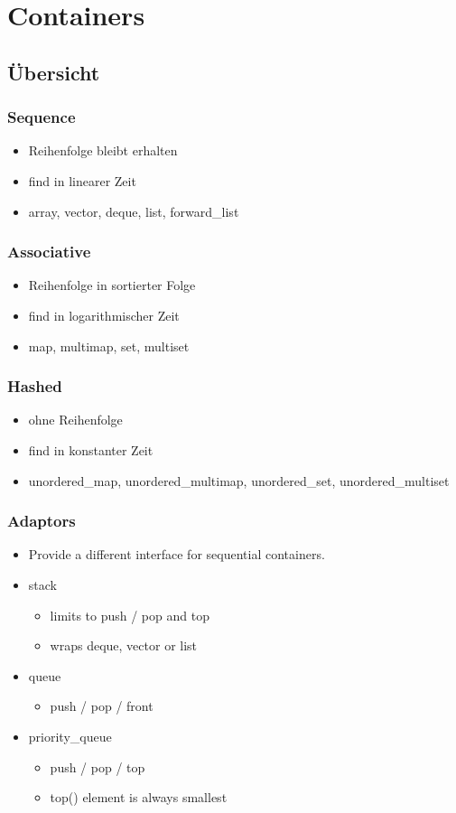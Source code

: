 \section{Containers}
\subsection{Übersicht}
\subsubsection{Sequence}
\begin{itemize}
	\item Reihenfolge bleibt erhalten
	\item find  in linearer Zeit
	\item array, vector, deque, list, forward\_list
\end{itemize}
\subsubsection{Associative}
\begin{itemize}
	\item Reihenfolge in sortierter Folge
	\item find  in logarithmischer Zeit
	\item map, multimap, set, multiset
\end{itemize}
\subsubsection{Hashed}
\begin{itemize}
	\item ohne Reihenfolge
	\item find  in konstanter Zeit
	\item unordered\_map, unordered\_multimap, \newline
		unordered\_set, unordered\_multiset
\end{itemize}
\subsubsection{Adaptors}
\begin{itemize}
	\item Provide a different interface for sequential containers. 
	\item stack
	\begin{itemize}
	\item limits to push / pop and top
	\item wraps deque, vector or list
	\end{itemize}
	\item queue
	\begin{itemize}
	\item push / pop / front
	\end{itemize}
	\item priority\_queue
	\begin{itemize}
	\item push / pop / top
	\item top() element is always smallest
	\end{itemize}
\end{itemize}

